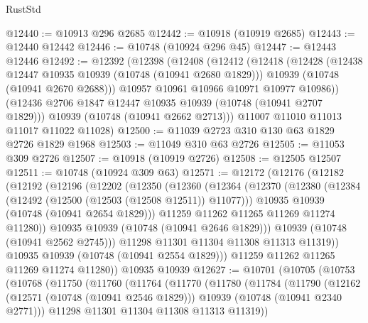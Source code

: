 \begin{lexlean}{RustStd}
\begin{coremodule}
{\begin{coremodule}
{{{{{@12440 := @10913 @296 @2685
@12442 := @10918 (@10919 @2685)
@12443 := @12440 @12442
@12446 := @10748 (@10924 @296 @45)
@12447 := @12443 @12446
@12492 := @12392
    (@12398
      (@12408
        (@12412
          (@12418
            (@12428
              (@12438 @12447 @10935 @10939 (@10748 (@10941 @2680 @1829)))
              @10939
              (@10748 (@10941 @2670 @2688)))
            @10957
            @10961
            @10966
            @10971
            @10977
            @10986))
        (@12436 @2706 @1847 @12447 @10935 @10939 (@10748 (@10941 @2707 @1829)))
        @10939
        (@10748 (@10941 @2662 @2713)))
      @11007
      @11010
      @11013
      @11017
      @11022
      @11028)
@12500 := @11039 @2723 @310 @130 @63 @1829 @2726 @1829 @1968
@12503 := @11049 @310 @63 @2726
@12505 := @11053 @309 @2726
@12507 := @10918 (@10919 @2726)
@12508 := @12505 @12507
@12511 := @10748 (@10924 @309 @63)
@12571 := @12172
    (@12176
      (@12182
        (@12192
          (@12196
            (@12202
              (@12350
                (@12360
                  (@12364
                    (@12370
                      (@12380
                        (@12384 (@12492 (@12500 (@12503 (@12508 @12511)) @11077)))
                        @10935
                        @10939
                        (@10748 (@10941 @2654 @1829)))
                      @11259
                      @11262
                      @11265
                      @11269
                      @11274
                      @11280))
                  @10935
                  @10939
                  (@10748 (@10941 @2646 @1829)))
                @10939
                (@10748 (@10941 @2562 @2745)))
              @11298
              @11301
              @11304
              @11308
              @11313
              @11319))
          @10935
          @10939
          (@10748 (@10941 @2554 @1829)))
        @11259
        @11262
        @11265
        @11269
        @11274
        @11280))
    @10935
    @10939
@12627 := @10701
    (@10705
      (@10753
        (@10768
          (@11750
            (@11760
              (@11764
                (@11770
                  (@11780
                    (@11784
                      (@11790
                        (@12162
                          (@12571 (@10748 (@10941 @2546 @1829)))
                          @10939
                          (@10748 (@10941 @2340 @2771)))
                        @11298
                        @11301
                        @11304
                        @11308
                        @11313
                        @11319))
}}}}}
\end{coremodule}}
\end{coremodule}
\end{lexlean}
